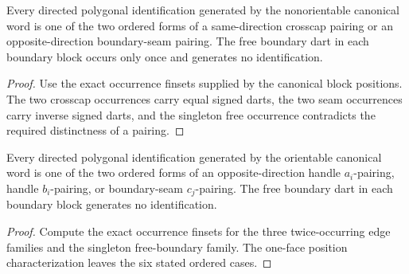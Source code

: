 \begin{lemma}
\label{moise:lem:canonical_nonorientable_pairings}
\leanok
{}
Every directed polygonal identification generated by the nonorientable
canonical word is one of the two ordered forms of a same-direction crosscap
pairing or an opposite-direction boundary-seam pairing.  The free boundary
dart in each boundary block occurs only once and generates no identification.
\end{lemma}

\begin{proof}
\leanok
Use the exact occurrence finsets supplied by the canonical block positions.
The two crosscap occurrences carry equal signed darts, the two seam
occurrences carry inverse signed darts, and the singleton free occurrence
contradicts the required distinctness of a pairing.
\end{proof}

\begin{lemma}
\label{moise:lem:canonical_orientable_pairings}
\leanok
{}
Every directed polygonal identification generated by the orientable canonical
word is one of the two ordered forms of an opposite-direction handle
$a_i$-pairing, handle $b_i$-pairing, or boundary-seam $c_j$-pairing.  The free
boundary dart in each boundary block generates no identification.
\end{lemma}

\begin{proof}
\leanok
Compute the exact occurrence finsets for the three twice-occurring edge
families and the singleton free-boundary family.  The one-face position
characterization leaves the six stated ordered cases.
\end{proof}

